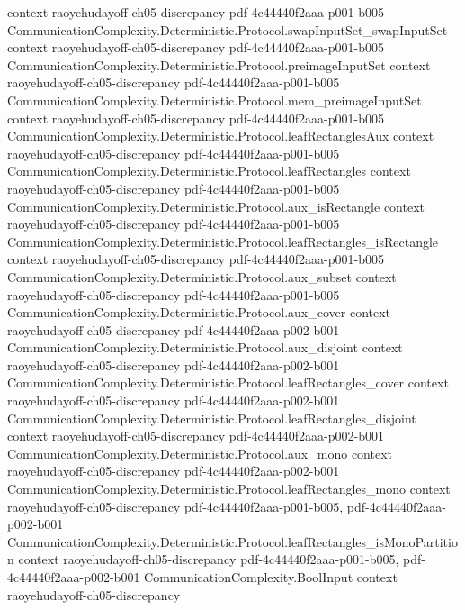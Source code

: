 \begin{lemma}
  {context}
  {raoyehudayoff-ch05-discrepancy}
  {pdf-4c44440f2aaa-p001-b005}
\proofstep
  {CommunicationComplexity.Deterministic.Protocol.swapInputSet_swapInputSet}
  {context}
  {raoyehudayoff-ch05-discrepancy}
  {pdf-4c44440f2aaa-p001-b005}
\proofstep
  {CommunicationComplexity.Deterministic.Protocol.preimageInputSet}
  {context}
  {raoyehudayoff-ch05-discrepancy}
  {pdf-4c44440f2aaa-p001-b005}
\proofstep
  {CommunicationComplexity.Deterministic.Protocol.mem_preimageInputSet}
  {context}
  {raoyehudayoff-ch05-discrepancy}
  {pdf-4c44440f2aaa-p001-b005}
\proofstep
  {CommunicationComplexity.Deterministic.Protocol.leafRectanglesAux}
  {context}
  {raoyehudayoff-ch05-discrepancy}
  {pdf-4c44440f2aaa-p001-b005}
\proofstep
  {CommunicationComplexity.Deterministic.Protocol.leafRectangles}
  {context}
  {raoyehudayoff-ch05-discrepancy}
  {pdf-4c44440f2aaa-p001-b005}
\proofstep
  {CommunicationComplexity.Deterministic.Protocol.aux_isRectangle}
  {context}
  {raoyehudayoff-ch05-discrepancy}
  {pdf-4c44440f2aaa-p001-b005}
\proofstep
  {CommunicationComplexity.Deterministic.Protocol.leafRectangles_isRectangle}
  {context}
  {raoyehudayoff-ch05-discrepancy}
  {pdf-4c44440f2aaa-p001-b005}
\proofstep
  {CommunicationComplexity.Deterministic.Protocol.aux_subset}
  {context}
  {raoyehudayoff-ch05-discrepancy}
  {pdf-4c44440f2aaa-p001-b005}
\proofstep
  {CommunicationComplexity.Deterministic.Protocol.aux_cover}
  {context}
  {raoyehudayoff-ch05-discrepancy}
  {pdf-4c44440f2aaa-p002-b001}
\proofstep
  {CommunicationComplexity.Deterministic.Protocol.aux_disjoint}
  {context}
  {raoyehudayoff-ch05-discrepancy}
  {pdf-4c44440f2aaa-p002-b001}
\proofstep
  {CommunicationComplexity.Deterministic.Protocol.leafRectangles_cover}
  {context}
  {raoyehudayoff-ch05-discrepancy}
  {pdf-4c44440f2aaa-p002-b001}
\proofstep
  {CommunicationComplexity.Deterministic.Protocol.leafRectangles_disjoint}
  {context}
  {raoyehudayoff-ch05-discrepancy}
  {pdf-4c44440f2aaa-p002-b001}
\proofstep
  {CommunicationComplexity.Deterministic.Protocol.aux_mono}
  {context}
  {raoyehudayoff-ch05-discrepancy}
  {pdf-4c44440f2aaa-p002-b001}
\proofstep
  {CommunicationComplexity.Deterministic.Protocol.leafRectangles_mono}
  {context}
  {raoyehudayoff-ch05-discrepancy}
  {pdf-4c44440f2aaa-p001-b005,
    pdf-4c44440f2aaa-p002-b001}
\proofstep
  {CommunicationComplexity.Deterministic.Protocol.leafRectangles_isMonoPartition}
  {context}
  {raoyehudayoff-ch05-discrepancy}
  {pdf-4c44440f2aaa-p001-b005,
    pdf-4c44440f2aaa-p002-b001}
\proofstep
  {CommunicationComplexity.BoolInput}
  {context}
  {raoyehudayoff-ch05-discrepancy}

\end{lemma}
